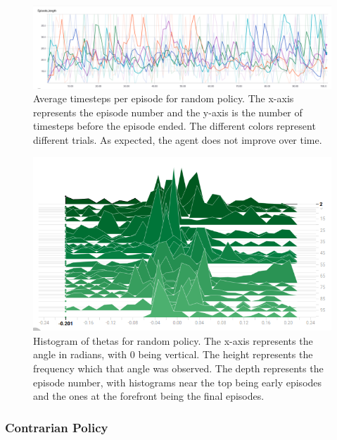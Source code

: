 \documentclass[12pt,a4paper]{article}
\begin{document}
\begin{figure}[htbp]
\begin{center}
\includegraphics[width=\linewidth]{rand_ep_length.png}
\caption{Average timesteps per episode for random policy. The x-axis represents the episode number and the y-axis is the number of timesteps before the episode ended. The different colors represent different trials. As expected, the agent does not improve over time.}
\label{rand_ep_length}
\end{center}
\end{figure}

\begin{figure}[htbp]
\begin{center}
\includegraphics[width=\linewidth]{rand_thetas.png}
\caption{Histogram of thetas for random policy. The x-axis represents the angle in radians, with 0 being vertical. The height represents the frequency which that angle was observed. The depth represents the episode number, with histograms near the top being early episodes and the ones at the forefront being the final episodes.}
\label{rand_thetas}
\end{center}
\end{figure}

\subsubsection*{Contrarian Policy}
\end{document}
